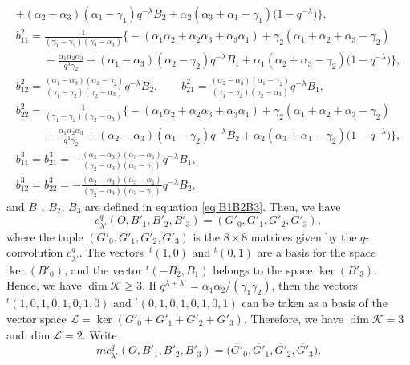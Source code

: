 \documentclass[pdftex]{sigma}
\numberwithin{equation}{section}
\theoremstyle{definition}
\begin{document}
\begin{gather*}
+ (\alpha_2-\alpha_3)(\alpha_1-\gamma_1) q^{-\lambda} B_2 + \alpha_2(\alpha_3+\alpha_1-\gamma_1)\bigl(1-q^{-\lambda}\bigr) \bigr\}, \\
 b^2_{11} = \frac{1}{(\gamma_1-\gamma_2)(\gamma_2-\alpha_3)}
\bigl\{ -(\alpha_1\alpha_2+\alpha_2\alpha_3+\alpha_3\alpha_1) + \gamma_2(\alpha_1+\alpha_2+\alpha_3-\gamma_2) \\
\phantom{b^1_{22} =}{}+ \frac{\alpha_1\alpha_2\alpha_3}{q^{\lambda}\gamma_2}
+ (\alpha_1-\alpha_3)(\alpha_2-\gamma_2) q^{-\lambda} B_1 + \alpha_1(\alpha_2+\alpha_3-\gamma_2)\bigl(1-q^{-\lambda}\bigr) \bigr\}, \\
 b^2_{12} = \frac{(\alpha_1-\alpha_3)(\alpha_2-\gamma_2)}{(\gamma_1-\gamma_2)(\gamma_2-\alpha_3)} q^{-\lambda} B_2, \qquad b^2_{21} = \frac{(\alpha_2-\alpha_3)(\alpha_1-\gamma_2)}{(\gamma_1-\gamma_2)(\gamma_2-\alpha_3)} q^{-\lambda} B_1, \\
 b^2_{22} = \frac{1}{(\gamma_1-\gamma_2)(\gamma_2-\alpha_3)}
\bigl\{ -(\alpha_1\alpha_2+\alpha_2\alpha_3+\alpha_3\alpha_1) + \gamma_2(\alpha_1+\alpha_2+\alpha_3-\gamma_2) \\
\phantom{b^1_{22} =}{} + \frac{\alpha_1\alpha_2\alpha_3}{q^{\lambda}\gamma_2}
+ (\alpha_2-\alpha_3)(\alpha_1-\gamma_2) q^{-\lambda} B_2 + \alpha_2(\alpha_3+\alpha_1-\gamma_2)\bigl(1-q^{-\lambda}\bigr) \bigr\}, \\
 b^3_{11} = b^3_{21} = -\frac{(\alpha_2-\alpha_3)(\alpha_3-\alpha_1)}{(\gamma_2-\alpha_3)(\alpha_3-\gamma_1)} q^{-\lambda} B_1, \\ b^3_{12} = b^3_{22} = -\frac{(\alpha_2-\alpha_3)(\alpha_3-\alpha_1)}{(\gamma_2-\alpha_3)(\alpha_3-\gamma_1)} q^{-\lambda} B_2,
\end{gather*}
and $B_1$, $B_2$, $B_3$ are defined in equation \eqref{eq:B1B2B3}.
Then, we have
\[
c^q_{\lambda'} (O, B'_1, B'_2, B'_3 ) = (G'_0, G'_1, G'_2, G'_3),
\]
 where the tuple $(G'_0, G'_1, G'_2, G'_3)$ is the $ 8\times 8$ matrices given by the $q$-convolution $c^q_{\lambda'} $.
The vectors~${}^t(1, 0)$ and ${}^t(0, 1)$ are a basis for the space $\ker (B'_0)$, and the vector ${}^t(-B_2, B_1)$ belongs to the space $\ker (B'_3)$.
Hence, we have $\dim \mathcal{K} \geq 3 $.
If $q^{\lambda+\lambda'}=\alpha_1\alpha_2/(\gamma_1\gamma_2)$,
then the vectors ${}^t(1,0,1,0,1,0,1,0)$ and ${}^t(0,1,0,1,0,1,0,1)$ can be taken as a basis of the vector space $\mathcal{L}=\ker(G'_0 + G'_1 + G'_2 + G'_3)$.
Therefore, we have $\dim \mathcal{K}=3$ and $\dim \mathcal{L}=2$.
Write
\[
mc^q_{\lambda'} (O, B'_1, B'_2, B'_3) = \bigl(\overline{G'}_0, \overline{G'}_1, \overline{G'}_2, \overline{G'}_3\bigr).
\]
\end{document}
